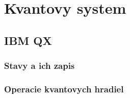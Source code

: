 
\chapter{Kvantovy system}

\section{IBM QX}

\subsection{Stavy a ich zapis}
\subsection{Operacie kvantovych hradiel}
